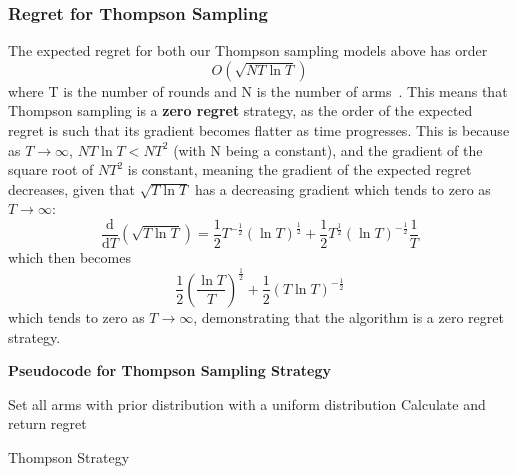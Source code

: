 \subsubsection{Regret for Thompson Sampling}
The expected regret for both our Thompson sampling models above has order
\[O\left(\sqrt{NT\ln{T}}\right)\]
where T is the number of rounds and N is the number of arms~\citep{agrawal2013further}.
This means that Thompson sampling is a \textbf{zero regret} strategy, as the order of the expected regret is such that its gradient becomes flatter as time progresses.
This is because as $T\to\infty$, $NT\ln{T} < NT^2$ (with N being a constant), and the gradient of the square root of $NT^2$ is constant, meaning the gradient of the expected regret decreases, given that $\sqrt{T\ln{T}}$ has a decreasing gradient which tends to zero as $T\to\infty$:
\newline
\[\frac{\mathrm{d} }{\mathrm{d} T} \left(\sqrt{T \ln{T}}\right) = \frac{1}{2}T^{-\frac{1}{2}}(\ln{T})^\frac{1}{2} + \frac{1}{2}T^{\frac{1}{2}}(\ln{T})^{-\frac{1}{2}}\frac{1}{T}\]
which then becomes
\newline
\[ \frac{1}{2}\left(\frac{\ln{T}}{T}\right)^\frac{1}{2} + \frac{1}{2}(T\ln{T})^{-\frac{1}{2}} \]
\newline
which tends to zero as $T\to\infty$, demonstrating that the algorithm is a zero regret strategy.


\textbf{Pseudocode for Thompson Sampling Strategy}
\newline
\begin{algorithm}[H]
    Set all arms with prior distribution with a uniform distribution\;
        Calculate and return regret
        \caption{Thompson Strategy}\label{alg:thompson_algorithm}
    \end{algorithm}